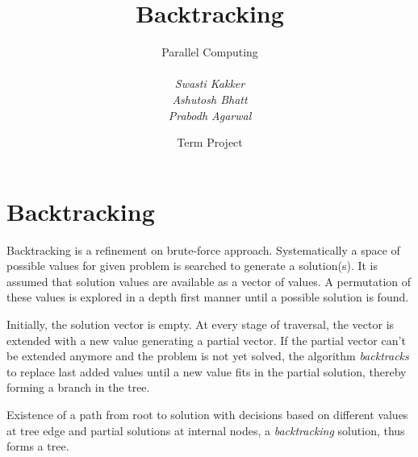 \documentclass[a4paper]{article}
\title{Backtracking}
\author{Parallel Computing\\\\\emph{Swasti Kakker}\\\emph{Ashutosh Bhatt}\\\emph{Prabodh Agarwal}}
\date{Term Project}
\begin{document}
\maketitle

\section{Backtracking}

Backtracking is a refinement on brute-force approach. Systematically a space of possible values for given problem is searched to generate a solution(s). It is assumed that solution values are available as a vector of values. A permutation of these values is explored in a depth first manner until a possible solution is found.

Initially, the solution vector is empty. At every stage of traversal, the vector is extended with a new value generating a partial vector. If the partial vector can't be extended anymore and the problem is not yet solved, the algorithm \emph{backtracks} to replace last added values until a new value fits in the partial solution, thereby forming a branch in the tree.

Existence of a path from root to solution with decisions based on different values at tree edge and partial solutions at internal nodes, a \emph{backtracking} solution, thus forms a tree.
\end{document}
